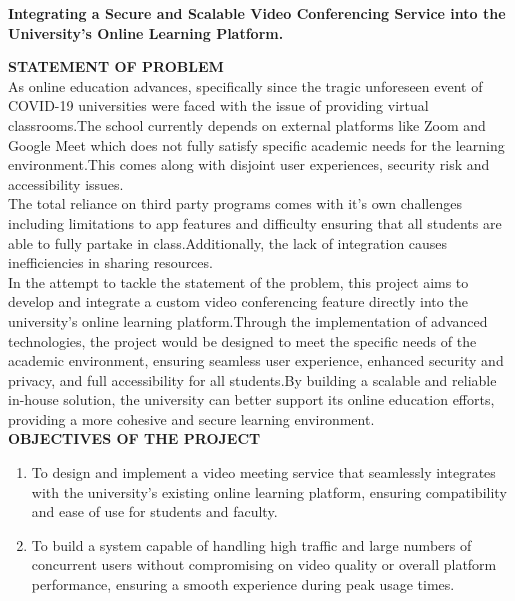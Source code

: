 \documentclass[12pt,a4paper]{report}
\begin{document}
		\begin{flushleft}
			\textbf{Integrating a Secure and Scalable Video Conferencing Service into the University's Online Learning Platform.}
		\end{flushleft}
		\textbf{STATEMENT OF PROBLEM} \\
		As online education advances, specifically since the tragic unforeseen event of COVID-19 universities were faced with the issue of providing virtual classrooms.The school currently depends on external platforms like Zoom and Google Meet which does not fully satisfy specific academic needs for the learning environment.This comes along with disjoint user experiences, security risk and accessibility issues.
	\newline
	\\
		The total reliance on third party programs comes with it's own challenges including limitations to app features and difficulty ensuring that all students are able to fully partake in class.Additionally, the lack of	integration causes inefficiencies in sharing resources.
			\newline
		\\In the attempt to tackle the statement of the problem, this project aims to develop and integrate a custom video conferencing feature directly into the university's online learning platform.Through the implementation of advanced technologies, the project would be designed to meet the specific needs of the academic environment, ensuring seamless user experience, enhanced security and privacy, and full accessibility for all students.By building a scalable and reliable in-house solution, the university can better support its online education efforts, providing a more cohesive and secure learning environment.
		\newline
		\\%
		\textbf{OBJECTIVES OF THE PROJECT}
		\begin{enumerate}[a]

			\item{
			To design and implement a video meeting service that seamlessly integrates with the university's existing online learning platform, ensuring compatibility and ease of use for students and faculty.}
			\item{
			To build a system capable of handling high traffic and large numbers of concurrent users without compromising on video quality or overall platform performance, ensuring a smooth experience during peak usage times.}

		\end{enumerate}
\end{document}
